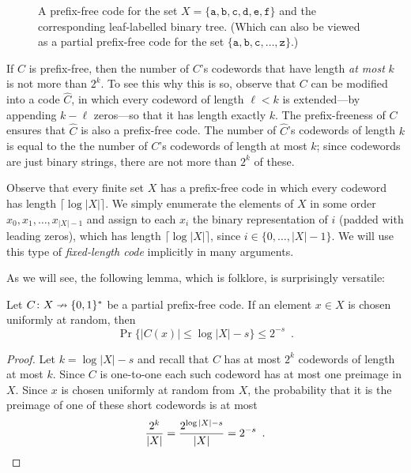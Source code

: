 \documentclass{patmorin}
\begin{document}
\begin{figure}
  \caption{A prefix-free code for the set
    $X=\{\mathtt{a},\mathtt{b},\mathtt{c},\mathtt{d},\mathtt{e},\mathtt{f}\}$
    and the corresponding leaf-labelled binary tree. (Which can also
    be viewed as a partial prefix-free code for the set
    $\{\mathtt{a},\mathtt{b},\mathtt{c},\ldots,\mathtt{z}\}$.)}
\end{figure}

If $C$ is prefix-free, then the number of $C$'s codewords that have
length \emph{at most} $k$ is not more than $2^k$. To see this why this
is so, observe that $C$ can be modified into a code $\hat C$, in which
every codeword of length $\ell <k$ is extended---by appending $k-\ell$
zeros---so that it has length exactly $k$. The prefix-freeness of $C$
ensures that $\hat C$ is also a prefix-free code. The number of
$\hat C$'s codewords of length $k$ is equal to the the number of $C$'s
codewords of length at most $k$; since codewords are just binary
strings, there are not more than $2^k$ of these.

Observe that every finite set $X$ has a prefix-free code in which
every codeword has length $\lceil\log |X|\rceil$. We simply enumerate
the elements of $X$ in some order $x_0,x_1,\ldots,x_{|X|-1}$ and
assign to each $x_i$ the binary representation of $i$ (padded with
leading zeros), which has length $\lceil\log |X|\rceil$, since
$i\in\{0,\ldots,|X|-1\}$.  We will use this type of \emph{fixed-length
  code} implicitly in many arguments.


As we will see, the following lemma, which is folklore, is
surprisingly versatile:
\begin{lem}
  Let $C\colon X\nrightarrow \{0,1\}^*$ be a partial prefix-free
  code. If an element $x\in X$ is chosen uniformly at random, then
  \[
    \Pr\{|C(x)|\le \log|X|-s\}\le 2^{-s} \enspace .
  \]
\end{lem}

\begin{proof}
  Let $k=\log|X|-s$ and recall that $C$ has at most $2^{k}$ codewords
  of length at most $k$.  Since $C$ is one-to-one each such codeword
  has at most one preimage in $X$.  Since $x$ is chosen uniformly at
  random from $X$, the probability that it is the preimage of one of
  these short codewords is at most
  \[
  \frac{2^k}{|X|} = \frac{2^{\log|X|-s}}{|X|} = 2^{-s} \enspace
  . \qedhere
  \]
\end{proof}
\end{document}
